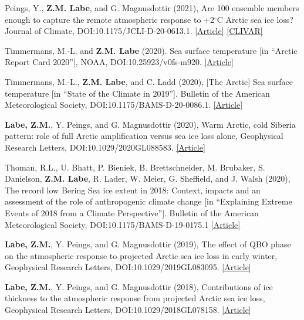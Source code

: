 \documentclass[margin,line,palatino,courier,10pt]{res}
\begin{document}
\begin{resume}
\begin{etaremune}[leftmargin=0in,topsep=0in,parsep=0in]
\item Peings, Y., \textbf{Z.M. Labe}, and G. Magnusdottir (2021), Are 100 ensemble members enough to capture the remote atmospheric response to $+$2$^{\circ}$C Arctic sea ice loss? Journal of Climate, DOI:10.1175/JCLI-D-20-0613.1. \href{https://journals.ametsoc.org/view/journals/clim/aop/JCLI-D-20-0613.1/JCLI-D-20-0613.1.xml}{[Article]} \href{https://usclivar.org/research-highlights/how-reproducible-response-2degc-arctic-sea-ice-loss-large-ensemble-simulations}{[CLIVAR]}
\item Timmermans, M.-L. and \textbf{Z.M. Labe} (2020). Sea surface temperature [in ``Arctic Report Card 2020''], NOAA, DOI:10.25923/v0fs-m920. \href{https://arctic.noaa.gov/Report-Card/Report-Card-2020/ArtMID/7975/ArticleID/885/Sea-Surface-Temperature}{[Article]}
\item Timmermans, M.-L., \textbf{Z.M. Labe}, and C. Ladd (2020), [The Arctic] Sea surface temperature [in ``State of the Climate in 2019'']. Bulletin of the American Meteorological Society, DOI:10.1175/BAMS-D-20-0086.1. \href{https://doi.org/10.1175/BAMS-D-20-0086.1}{[Article]}
\item \textbf{Labe, Z.M.}, Y. Peings, and G. Magnusdottir (2020), Warm Arctic, cold Siberia pattern: role of full Arctic amplification versus sea ice loss alone, Geophysical Research Letters, DOI:10.1029/2020GL088583. \href{https://agupubs.onlinelibrary.wiley.com/doi/10.1029/2020GL088583}{[Article]}
\item Thoman, R.L., U. Bhatt, P. Bieniek, B. Brettschneider, M. Brubaker, S. Danielson, \textbf{Z.M. Labe}, R. Lader, W. Meier, G. Sheffield, and J. Walsh (2020), The record low Bering Sea ice extent in 2018: Context, impacts and an assessment of the role of anthropogenic climate change [in ``Explaining Extreme Events of 2018 from a Climate Perspective'']. Bulletin of the American Meteorological Society, DOI:10.1175/BAMS-D-19-0175.1 \href{https://journals.ametsoc.org/doi/abs/10.1175/BAMS-D-19-0175.1}{[Article]}
\item \textbf{Labe, Z.M.}, Y. Peings, and G. Magnusdottir (2019), The effect of QBO phase on the atmospheric response to projected Arctic sea ice loss in early winter, Geophysical Research Letters, DOI:10.1029/2019GL083095. \href{https://agupubs.onlinelibrary.wiley.com/doi/10.1029/2019GL083095}{[Article]}
\item \textbf{Labe, Z.M.}, Y. Peings, and G. Magnusdottir (2018), Contributions of ice thickness to the atmospheric response from projected Arctic sea ice loss, Geophysical Research Letters, DOI:10.1029/2018GL078158. \href{https://agupubs.onlinelibrary.wiley.com/doi/10.1029/2018GL078158}{[Article]}

\end{etaremune}
\end{resume}
\end{document}
